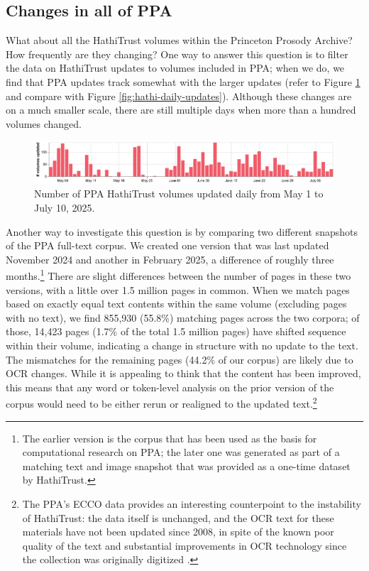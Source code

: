 \documentclass[final]{anthology-ch} %
\begin{document}
\subsection{Changes in all of PPA}

What about all the HathiTrust volumes within the Princeton Prosody Archive? How frequently are they changing? One way to answer this question is to filter the data on HathiTrust updates to volumes included in PPA; when we do, we find that PPA updates track somewhat with the larger updates (refer to Figure \ref{fig:ppa-daily-updates} and compare with Figure \ref{fig:hathi-daily-updates}). Although these changes are on a much smaller scale, there are still multiple days when more than a hundred volumes changed.

\begin{figure}[t!]
    \centering
    \includegraphics[width=1\linewidth]{images/ppa_hathitrust_changes_countonly.png}
    \caption{Number of PPA HathiTrust volumes updated daily from May 1 to July 10, 2025.}
    \label{fig:ppa-daily-updates}
\end{figure}

Another way to investigate this question is by comparing two different snapshots of the PPA full-text corpus. We created one version that was last updated November 2024 and another in February 2025, a difference of roughly three months.\footnote{The earlier version is the corpus that has been used as the basis for computational research on PPA; the later one was generated as part of a matching text and image snapshot that was provided as a one-time dataset by HathiTrust.} There are slight differences between the number of pages in these two versions, with a little over 1.5 million pages in common. When we match pages based on exactly equal text contents within the same volume (excluding pages with no text), we find 855,930 (55.8\%) matching pages across the two corpora; of those, 14,423 pages (1.7\% of the total 1.5 million pages) have shifted sequence within their volume, indicating a change in structure with no update to the text. The mismatches for the remaining pages (44.2\% of our corpus) are likely due to OCR changes. While it is appealing to think that the content has been improved, this means that any word or token-level analysis on the prior version of the corpus would need to be either rerun or realigned to the updated text.\footnote{The PPA's ECCO data provides an interesting counterpoint to the instability of HathiTrust: the data itself is unchanged, and the OCR text for these materials have not been updated since 2008, in spite of the known poor quality of the text and substantial improvements in OCR technology since the collection was originally digitized \cite{hill_quantifying_2019}.}
\end{document}
